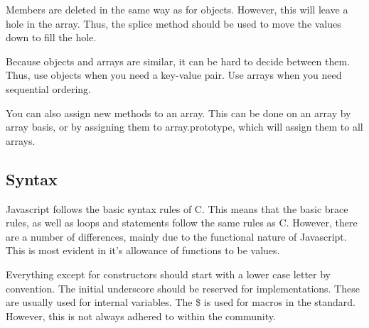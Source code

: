 			Members are deleted in the same way as for objects. 
			However, this will leave a hole in the array. 
			Thus, the splice method should be used to move the values down to fill the hole. 

			Because objects and arrays are similar, it can be hard to decide between them. 
			Thus, use objects when you need a key-value pair. 
			Use arrays when you need sequential ordering. 

			You can also assign new methods to an array. 
			This can be done on an array by array basis, or by assigning them to array.prototype, 
			which will assign them to all arrays. 
		\subsection{Syntax}
			Javascript follows the basic syntax rules of C. 
			This means that the basic brace rules, as well as loops and statements follow the same rules as C. 
			However, there are a number of differences, mainly due to the functional nature of Javascript. 
			This is most evident in it's allowance of functions to be values. 

			Everything except for constructors should start with a lower case letter by convention. 
			The initial underscore should be reserved for implementations. 
			These are usually used for internal variables. 
			The \$ is used for macros in the standard. 
			However, this is not always adhered to within the community. 

